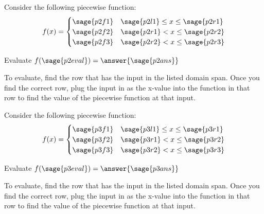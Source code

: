 \documentclass{ximera}
\begin{document}
\begin{problem}
    Consider the following piecewise function:
    \[
        f(x) =
            \begin{cases}
                \sage{p2f1}     & \sage{p2l1}\leq x \leq \sage{p2r1} \\
                \sage{p2f2}     & \sage{p2r1} < x \leq \sage{p2r2} \\
                \sage{p2f3}     & \sage{p2r2} < x \leq \sage{p2r3}
            \end{cases}
    \]
    
    Evaluate $f(\sage{p2eval}) = \answer{\sage{p2ans}}$
    \begin{feedback}
        To evaluate, find the row that has the input in the listed domain span. Once you find the correct row, plug the input in as the x-value into the function in that row to find the value of the piecewise function at that input.
    \end{feedback}
    
\end{problem}




\begin{problem}
    Consider the following piecewise function:
    \[
        f(x) =
            \begin{cases}
                \sage{p3f1}     & \sage{p3l1}\leq x \leq \sage{p3r1} \\
                \sage{p3f2}     & \sage{p3r1} < x \leq \sage{p3r2} \\
                \sage{p3f3}     & \sage{p3r2} < x \leq \sage{p3r3}
            \end{cases}
    \]
    
    Evaluate $f(\sage{p3eval}) = \answer{\sage{p3ans}}$
    \begin{feedback}
        To evaluate, find the row that has the input in the listed domain span. Once you find the correct row, plug the input in as the x-value into the function in that row to find the value of the piecewise function at that input.
    \end{feedback}
    
\end{problem}
\end{document}
